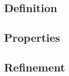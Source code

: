 \subsection{Definition}
\label{sec_de_sem_fd_def}

\subsection{Properties}
\label{sec_de_sem_fd_prop}

\subsection{Refinement}
\label{sec_de_sem_fd_ref}
